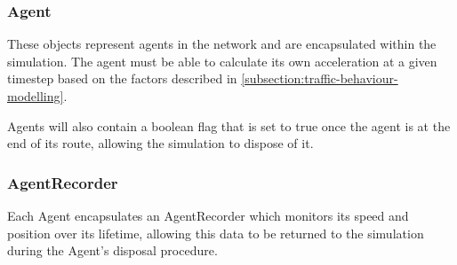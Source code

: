         \subsubsection{Agent}

            These objects represent agents in the network and are encapsulated within the simulation. The agent must be able to calculate its own acceleration at a given timestep based on the factors described in \autoref{subsection:traffic-behaviour-modelling}.

            Agents will also contain a boolean  flag that is set to true once the agent is at the end of its route, allowing the simulation to dispose of it.


        \subsubsection{AgentRecorder}

            Each Agent encapsulates an AgentRecorder which monitors its speed and position over its lifetime, allowing this data to be returned to the simulation during the Agent's disposal procedure.


